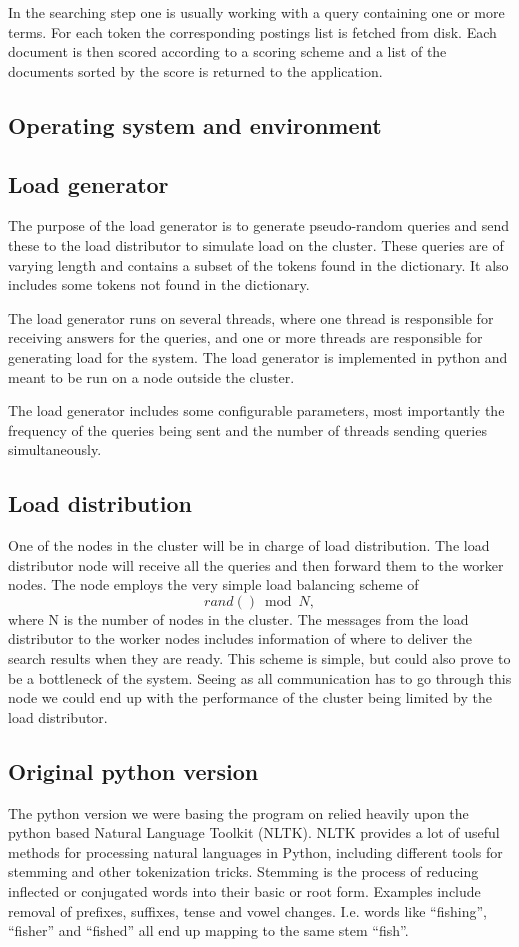 In the searching step one is usually working with a query containing one or more terms. For each token the corresponding postings list is fetched from disk. Each document is then scored according to a scoring scheme and a list of the documents sorted by the score is returned to the application.


\subsection{Operating system and environment}
\subsection{Load generator}
The purpose of the load generator is to generate pseudo-random queries and send these to the load distributor to simulate load on the cluster. These queries are of varying length and contains a subset of the tokens found in the dictionary. It also includes some tokens not found in the dictionary.

The load generator runs on several threads, where one thread is responsible for receiving answers for the queries, and one or more threads are responsible for generating load for the system. The load generator is implemented in python and meant to be run on a node outside the cluster.

The load generator includes some configurable parameters, most importantly the frequency of the queries being sent and the number of threads sending queries simultaneously.

\subsection{Load distribution}
One of the nodes in the cluster will be in charge of load distribution. The load distributor node will receive all the queries and then forward them to the worker nodes.
The node employs the very simple load balancing scheme of $$rand() \bmod N,$$ where N is the number of nodes in the cluster.
The messages from the load distributor to the worker nodes includes information of where to deliver the search results when they are ready.
This scheme is simple, but could also prove to be a bottleneck of the system. Seeing as all communication has to go through this node we could end up with the performance of the cluster being limited by the load distributor.

\subsection{Original python version}
The python version we were basing the program on relied heavily upon the python based Natural Language Toolkit\cite{nltk} (NLTK).
NLTK provides a lot of useful methods for processing natural languages in Python, including different tools for stemming and other tokenization tricks.
Stemming is the process of reducing inflected or conjugated words into their basic or root form. Examples include removal of prefixes, suffixes, tense and vowel changes. I.e. words like ``fishing'', ``fisher'' and ``fished'' all end up mapping to the same stem ``fish''.

